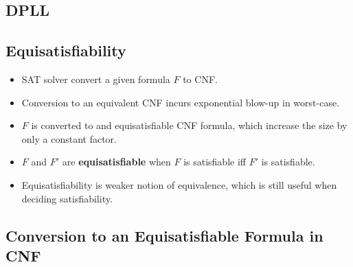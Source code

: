 \subsection{DPLL}

\subsection{Equisatisfiability}
\begin{itemize}
	\item SAT solver convert a given formula $F$ to CNF.
	\item Conversion to an equivalent CNF incurs exponential blow-up in worst-case.
	\item $F$ is converted to and equisatisfiable CNF formula, which increase the size by only a constant factor.
	\item $F$ and $F'$ are \textbf{equisatisfiable} when $F$ is satisfiable iff $F'$ is satisfiable.
	\item Equisatisfiability is weaker notion of equivalence, which is still useful when deciding satisfiability.
\end{itemize}

\subsection{Conversion to an Equisatisfiable Formula in CNF}
%
%
